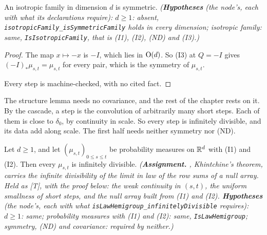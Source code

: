 \begin{lemma}
\label{lem:isotropic-symmetric}
\leanok
{}
An isotropic family in dimension $d$ is symmetric.
\statusT\quad\emph{(\textbf{Hypotheses} (the node's, each with what its declarations require):
$d \ge 1$: absent, \texttt{isotropicFamily\_isSymmetricFamily} holds in every dimension; isotropic
family: same, \texttt{IsIsotropicFamily}, that is (I1), (I2), (ND) and (I3).)}
\end{lemma}

\begin{proof}
\leanok
The map $x \mapsto -x$ is $-I$, which lies in $\mathrm{O}(d)$. So (I3) at $Q = -I$ gives
$(-I)_*\mu_{s,t} = \mu_{s,t}$ for every pair, which is the symmetry of $\mu_{s,t}$.

Every step is machine-checked, with no cited fact.
\end{proof}

The structure lemma needs no covariance, and the rest of the chapter rests on it. By the cascade, a
step is the convolution of arbitrarily many short steps. Each of them is close to $\delta_0$, by
continuity in scale. So every step is infinitely divisible, and its \Levy{} data add along scale.
The first half needs neither symmetry nor (ND).

\begin{lemma}
\label{lem:steps-infinitely-divisible}
\leanok
{}
Let $d \ge 1$, and let $(\mu_{s,t})_{0 \le s \le t}$ be probability measures on $\mathbb{R}^d$ with (I1)
and (I2). Then every $\mu_{s,t}$ is infinitely divisible.
\statusA\quad{}\quad\emph{(\textbf{Assignment.} , Khintchine's theorem,
carries the infinite divisibility of the limit in law of the row sums of a null array. Held as
[T], with the proof below: the weak continuity in $(s,t)$, the uniform smallness of short steps,
and the null array built from (I1) and (I2). \textbf{Hypotheses} (the node's, each with what
\texttt{isLawHemigroup\_infinitelyDivisible} requires): $d \ge 1$: same; probability measures with
(I1) and (I2): same, \texttt{IsLawHemigroup}; symmetry, (ND) and covariance: required by neither.)}
\end{lemma}

